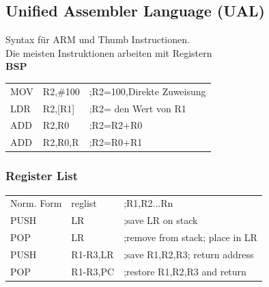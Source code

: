 \begin{multicols}{2}
    \begin{minipage}{\linewidth}
        \subsection{Unified Assembler Language (UAL)}
        Syntax für ARM und Thumb Instructionen.\\
        Die meisten Instruktionen arbeiten mit Registern\\
        \textbf{BSP}\newline
        \begin{tabular}{lll}
            MOV&R2,\#100  &;R2=100,Direkte Zuweisung  \\ 
            LDR&R2,[R1]   &;R2= den Wert von R1  \\ 
            ADD&R2,R0     &;R2=R2+R0  \\ 
            ADD&R2,R0,R   &;R2=R0+R1  \\ 
        \end{tabular} 
    \end{minipage}
    
    \begin{minipage}{0.8\linewidth}
        \subsubsection{Register List}
        \begin{tabular}{lll}
            Norm. Form&{reglist}  &;{R1,R2...Rn}  \\ 
            PUSH& {LR} & ;save LR on stack\\ 
            POP&  {LR}&  ;remove from stack; place in LR\\  
            PUSH& {R1-R3,LR} & ;save R1,R2,R3; return address\\  
            POP& {R1-R3,PC} &;restore R1,R2,R3 and return \\ 
        \end{tabular} 
    \end{minipage}
\end{multicols}
\clearpage
